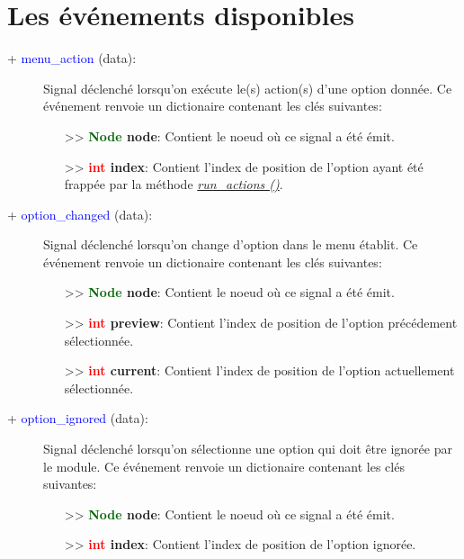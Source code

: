\documentclass[a4paper, 11pt]{article}
\begin{document}
	\section{Les événements disponibles}
	\begin{description}
		\item [+ \textcolor{blue}{menu\_action} (data):] Signal déclenché lorsqu'on exécute le(s) action(s)
		d'une option donnée. Ce événement renvoie un dictionaire contenant les clés suivantes:
		\begin{itemize}
			\item [>> \textbf{\textcolor{darkgreen}{Node} node}:] Contient le noeud où ce signal a été émit.
			\item [>> \textbf{\textcolor{red}{int} index}:] Contient l'index de position de l'option ayant 
			été frappée par la méthode \textit{\hyperlink{runactions}{run\_actions ()}}.\\
		\end{itemize}
	\end{description}
	\begin{description}
		\item [+ \textcolor{blue}{option\_changed} (data):] Signal déclenché lorsqu'on change d'option dans 
		le menu établit. Ce événement renvoie un dictionaire contenant les clés suivantes:
		\begin{itemize}
			\item [>> \textbf{\textcolor{darkgreen}{Node} node}:] Contient le noeud où ce signal a été émit.
			\item [>> \textbf{\textcolor{red}{int} preview}:] Contient l'index de position de l'option 
			précédement sélectionnée.
			\item [>> \textbf{\textcolor{red}{int} current}:] Contient l'index de position de l'option 
			actuellement sélectionnée.\\
		\end{itemize}
	\end{description}
	\begin{description}
		\item [+ \textcolor{blue}{option\_ignored} (data):] Signal déclenché lorsqu'on sélectionne une 
		option qui doit être ignorée par le module. Ce événement renvoie un dictionaire contenant les clés 
		suivantes:
		\begin{itemize}
			\item [>> \textbf{\textcolor{darkgreen}{Node} node}:] Contient le noeud où ce signal a été émit.
			\item [>> \textbf{\textcolor{red}{int} index}:] Contient l'index de position de l'option 
			ignorée.\\
		\end{itemize}
	\end{description}
\end{document}
